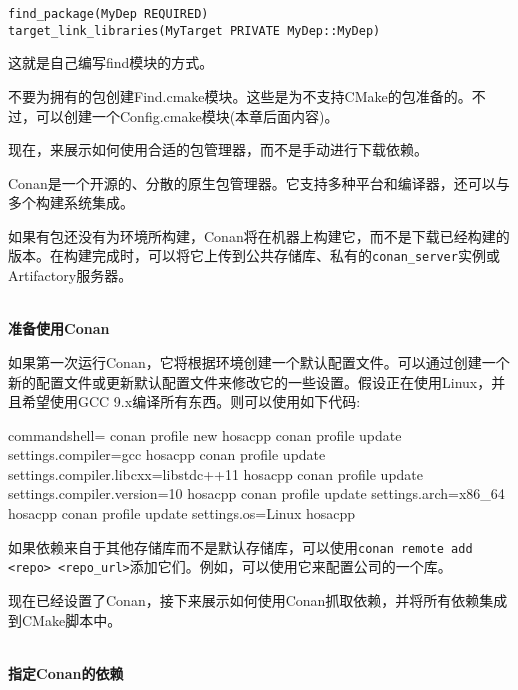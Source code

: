 \begin{lstlisting}[style=styleCMake]
find_package(MyDep REQUIRED)
target_link_libraries(MyTarget PRIVATE MyDep::MyDep)
\end{lstlisting}

这就是自己编写find模块的方式。

\begin{tcolorbox}[colback=blue!5!white,colframe=blue!75!black, title=Note]
\hspace*{0.7cm}不要为拥有的包创建Find\*.cmake模块。这些是为不支持CMake的包准备的。不过，可以创建一个Config\*.cmake模块(本章后面内容)。
\end{tcolorbox}

现在，来展示如何使用合适的包管理器，而不是手动进行下载依赖。


Conan是一个开源的、分散的原生包管理器。它支持多种平台和编译器，还可以与多个构建系统集成。

如果有包还没有为环境所构建，Conan将在机器上构建它，而不是下载已经构建的版本。在构建完成时，可以将它上传到公共存储库、私有的\texttt{conan\_server}实例或Artifactory服务器。

\hspace*{\fill} \\ %
\noindent
\textbf{准备使用Conan}

如果第一次运行Conan，它将根据环境创建一个默认配置文件。可以通过创建一个新的配置文件或更新默认配置文件来修改它的一些设置。假设正在使用Linux，并且希望使用GCC 9.x编译所有东西。则可以使用如下代码:

\begin{tcblisting}{commandshell={}}
conan profile new hosacpp
conan profile update settings.compiler=gcc hosacpp
conan profile update settings.compiler.libcxx=libstdc++11 hosacpp
conan profile update settings.compiler.version=10 hosacpp
conan profile update settings.arch=x86_64 hosacpp
conan profile update settings.os=Linux hosacpp
\end{tcblisting}

如果依赖来自于其他存储库而不是默认存储库，可以使用\texttt{conan remote add <repo> <repo\_url>}添加它们。例如，可以使用它来配置公司的一个库。

现在已经设置了Conan，接下来展示如何使用Conan抓取依赖，并将所有依赖集成到CMake脚本中。

\hspace*{\fill} \\ %
\noindent
\textbf{指定Conan的依赖}

